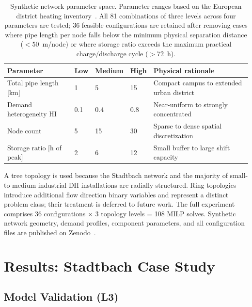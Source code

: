 \documentclass[review,3p]{elsarticle}
\begin{document}
\begin{table}[htbp]
\centering
\caption{Synthetic network parameter space. Parameter ranges based on
the European district heating inventory~\cite{Werner2017,Frederiksen2013}.
All 81 combinations of three levels across four parameters are tested;
36 feasible configurations are retained after removing cases where pipe
length per node falls below the minimum physical separation distance
($<$50~m/node) or where storage ratio exceeds the maximum practical
charge/discharge cycle ($>$72~h).}
\label{tab:synthetic}
\begin{tabular}{@{}llllp{4.5cm}@{}}
\toprule
Parameter & Low & Medium & High & Physical rationale \\
\midrule
Total pipe length [km] & 1 & 5 & 15
  & Compact campus to extended urban district \\
Demand heterogeneity HI & 0.1 & 0.4 & 0.8
  & Near-uniform to strongly concentrated \\
Node count & 5 & 15 & 30
  & Sparse to dense spatial discretization \\
Storage ratio [h of peak] & 2 & 6 & 12
  & Small buffer to large shift capacity \\
\bottomrule
\end{tabular}
\end{table}

A tree topology is used because the Stadtbach network and the majority
of small- to medium industrial DH installations are radially structured.
Ring topologies introduce additional flow direction binary variables and
represent a distinct problem class; their treatment is deferred to future
work. The full experiment comprises 36 configurations $\times$ 3
topology levels = 108 MILP solves. Synthetic network geometry, demand
profiles, component parameters, and all configuration files are
published on Zenodo~\cite{Zenodo_data}.

\section{Results: Stadtbach Case Study}
\label{sec:results}

\subsection{Model Validation (L3)}
\label{sec:results_validation}
\end{document}
